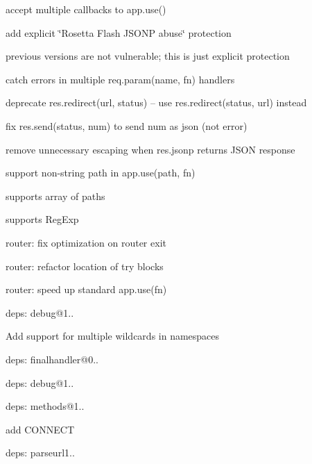 {\ttfamily 
\begin{DoxyItemize}
\item accept multiple callbacks to {\ttfamily app.\+use()}
\item add explicit \char`\"{}\+Rosetta Flash J\+S\+O\+N\+P abuse\char`\"{} protection
\begin{DoxyItemize}
\item previous versions are not vulnerable; this is just explicit protection
\end{DoxyItemize}
\item catch errors in multiple {\ttfamily req.\+param(name, fn)} handlers
\item deprecate {\ttfamily res.\+redirect(url, status)} -- use {\ttfamily res.\+redirect(status, url)} instead
\item fix {\ttfamily res.\+send(status, num)} to send {\ttfamily num} as json (not error)
\item remove unnecessary escaping when {\ttfamily res.\+jsonp} returns J\+S\+ON response
\item support non-\/string {\ttfamily path} in {\ttfamily app.\+use(path, fn)}
\begin{DoxyItemize}
\item supports array of paths
\item supports {\ttfamily Reg\+Exp}
\end{DoxyItemize}
\item router\+: fix optimization on router exit
\item router\+: refactor location of {\ttfamily try} blocks
\item router\+: speed up standard {\ttfamily app.\+use(fn)}
\item deps\+: debug@1..
\begin{DoxyItemize}
\item Add support for multiple wildcards in namespaces
\end{DoxyItemize}
\item deps\+: finalhandler@0..
\begin{DoxyItemize}
\item deps\+: debug@1..
\end{DoxyItemize}
\item deps\+: methods@1..
\begin{DoxyItemize}
\item add {\ttfamily C\+O\+N\+N\+E\+CT}
\end{DoxyItemize}
\item deps\+: parseurl1..

\end{DoxyItemize}}

